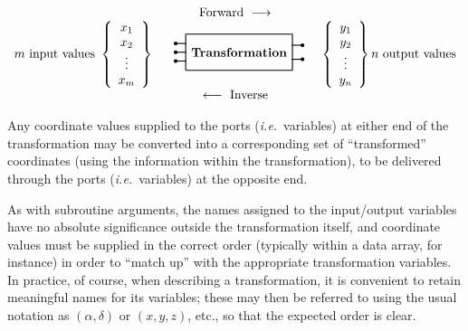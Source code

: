 \begin{displaymath}
\begin{array}{c}
\mbox{Forward } \longrightarrow \\

m \mbox{ input values }
\left\{ \begin{array}{c} x_1 \\ x_2 \\ \vdots \\ x_m \end{array} \right\}

\begin{array}{c}\mbox{
\setlength{\unitlength}{1mm}
\thicklines
\begin{picture}(40, 10)(-20,-5)
\put(-15,-5){\framebox(30,10){\bf Transformation}}
\multiput(-15,-2.5)(0,2.5){3}{\line(-1,0){3}}
\multiput(-18,-2.5)(0,2.5){3}{\circle*{1}}
\multiput(15,-2)(0,4){2}{\line(1,0){3}}
\multiput(18,-2)(0,4){2}{\circle*{1}}
\end{picture}
} \end{array}

\left\{ \begin{array}{c} y_1 \\ y_2 \\ \vdots \\ y_n \end{array} \right\}
n \mbox{ output values}

\\ \longleftarrow \mbox{ Inverse}
\end{array}
\end{displaymath}

Any coordinate values supplied to the ports ({\em i.e.}\ variables) at
either end of the transformation may be converted into a corresponding set
of ``transformed'' coordinates (using the information within the
transformation), to be delivered through the ports ({\em i.e.}\ variables)
at the opposite end. 

As with subroutine arguments, the names assigned to the input/output
variables have no absolute significance outside the transformation itself,
and coordinate values must be supplied in the correct order (typically
within a data array, for instance) in order to ``match up'' with the
appropriate transformation variables. 
In practice, of course, when describing a transformation, it is convenient
to retain meaningful names for its variables; these may then be referred to
using the usual notation as \mbox{$(\alpha,\delta)$} or \mbox{$(x,y,z)$}, 
etc., so that the expected order is clear. 


